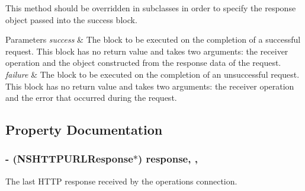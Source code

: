 This method should be overridden in subclasses in order to specify the response object passed into the success block.


\begin{DoxyParams}{Parameters}
{\em success} & The block to be executed on the completion of a successful request. This block has no return value and takes two arguments\+: the receiver operation and the object constructed from the response data of the request. \\
\hline
{\em failure} & The block to be executed on the completion of an unsuccessful request. This block has no return value and takes two arguments\+: the receiver operation and the error that occurred during the request. \\
\hline
\end{DoxyParams}


\subsection{Property Documentation}
\hypertarget{interface_a_f_h_t_t_p_request_operation_a7a6e0248cffbdfa767d79e864fc1e730}{}
\subsubsection[{response}]{\setlength{\rightskip}{0pt plus 5cm}-\/ (N\+S\+H\+T\+T\+P\+U\+R\+L\+Response$\ast$) response\hspace{0.3cm}{\ttfamily [read]}, {\ttfamily [nonatomic]}, {\ttfamily [strong]}}\label{interface_a_f_h_t_t_p_request_operation_a7a6e0248cffbdfa767d79e864fc1e730}
The last H\+T\+T\+P response received by the operation\textquotesingle{}s connection. \hypertarget{interface_a_f_h_t_t_p_request_operation_a7418f7784dcaf21623ce588fb27734c3}{}
